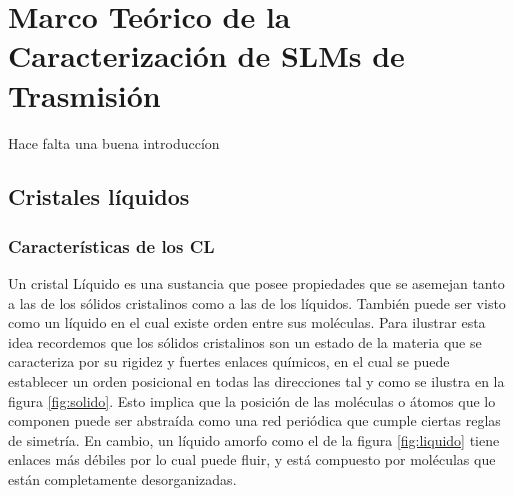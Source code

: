 \section{Marco Teórico de la Caracterización de SLMs de Trasmisión}
\label{sec:marco_teorico}

Hace falta una buena introduccíon

\subsection{Cristales líquidos}
\subsubsection{Características de los CL}  
Un cristal Líquido es una sustancia que posee propiedades que
se asemejan tanto a las de los sólidos cristalinos como a las de los
líquidos. También puede ser visto como un líquido en el cual existe
orden entre sus moléculas. Para ilustrar esta idea recordemos que los
sólidos cristalinos son un estado de la materia que se caracteriza por
su rigidez y fuertes enlaces químicos, en el cual se puede
establecer un orden posicional en todas las direcciones tal y como se
ilustra en la figura \ref{fig:solido}. Esto implica que la posición de
las moléculas o átomos que lo componen puede ser abstraída como una
red periódica que cumple ciertas reglas de simetría. En cambio, un
líquido amorfo como el de la figura \ref{fig:liquido} tiene enlaces
más débiles por lo cual puede fluir, y está compuesto
por moléculas que están completamente desorganizadas. 
